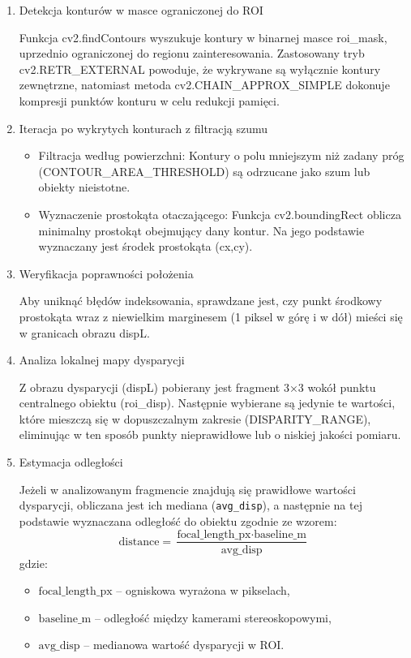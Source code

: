 \documentclass[magisterska]{pracadypl}
\begin{document}
\begin{enumerate}
\item Detekcja konturów w masce ograniczonej do ROI

Funkcja cv2.findContours wyszukuje kontury w binarnej masce roi\_mask, uprzednio ograniczonej do regionu zainteresowania. Zastosowany tryb cv2.RETR\_EXTERNAL powoduje, że wykrywane są wyłącznie kontury zewnętrzne, natomiast metoda cv2.CHAIN\_APPROX\_SIMPLE dokonuje kompresji punktów konturu w celu redukcji pamięci.
\item Iteracja po wykrytych konturach z filtracją szumu
  \begin{itemize}
    \item Filtracja według powierzchni: Kontury o polu mniejszym niż zadany próg (CONTOUR\_AREA\_THRESHOLD) są odrzucane jako szum lub obiekty nieistotne.
    \item Wyznaczenie prostokąta otaczającego: Funkcja cv2.boundingRect oblicza minimalny prostokąt obejmujący dany kontur. Na jego podstawie wyznaczany jest środek prostokąta (cx,cy).
  \end{itemize}
\item Weryfikacja poprawności położenia

Aby uniknąć błędów indeksowania, sprawdzane jest, czy punkt środkowy prostokąta wraz z niewielkim marginesem (1 piksel w górę i w dół) mieści się w granicach obrazu dispL.
\item Analiza lokalnej mapy dysparycji

Z obrazu dysparycji (dispL) pobierany jest fragment 3×3 wokół punktu centralnego obiektu (roi\_disp). Następnie wybierane są jedynie te wartości, które mieszczą się w dopuszczalnym zakresie (DISPARITY\_RANGE), eliminując w ten sposób punkty nieprawidłowe lub o niskiej jakości pomiaru.
\item Estymacja odległości

Jeżeli w analizowanym fragmencie znajdują się prawidłowe wartości dysparycji, obliczana jest ich mediana (\texttt{avg\_disp}), a następnie na tej podstawie wyznaczana odległość do obiektu zgodnie ze wzorem:
\[
\text{distance} = \frac{\text{focal\_length\_px} \cdot \text{baseline\_m}}{\text{avg\_disp}}
\]
gdzie:
\begin{itemize}
    \item $\text{focal\_length\_px}$ – ogniskowa wyrażona w pikselach,
    \item $\text{baseline\_m}$ – odległość między kamerami stereoskopowymi,
    \item $\text{avg\_disp}$ – medianowa wartość dysparycji w ROI.
\end{itemize}


\end{enumerate}
\end{document}

